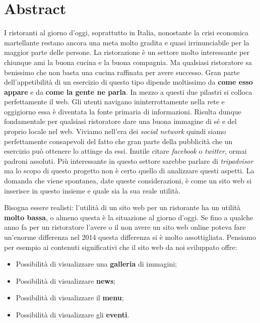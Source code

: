 \section{Abstract}

I ristoranti al giorno d'oggi, soprattutto in Italia, nonostante la crisi economica martellante restano ancora una meta molto gradita e quasi irrinunciabile per la maggior parte delle persone. La ristorazione è un settore molto interessante per chiunque ami la buona cucina e la buona compagnia. Ma qualsiasi ristoratore sa benissimo che non basta una cucina raffinata per avere successo. Gran parte dell'appetibilità di un esercizio di questo tipo dipende moltissimo da \textbf{come esso appare} e da \textbf{come la gente ne parla}. In mezzo a questi due pilastri si colloca perfettamente il web. Gli utenti navigano ininterrottamente nella rete e oggigiorno essa è diventata la fonte primaria di informazioni. Risulta dunque fondamentale per qualsiasi ristoratore dare una buona immagine di sé e del proprio locale nel web. Viviamo nell'era dei \textit{social network} quindi siamo perfettamente consapevoli del fatto che gran parte della pubblicità che un esercizio può ottenere lo attinge da essi. Inutile citare \textit{facebook} o \textit{twitter}, ormai padroni assoluti. Più interessante in questo settore sarebbe parlare di \textit{tripadvisor} ma lo scopo di questo progetto non è certo quello di analizzare questi aspetti. La domanda che viene spontanea, date queste considerazioni, è come un sito web si inserisce in questo insieme e quale sia la sua reale utilità. 

Bisogna essere realisti: l'utilità di un sito web per un ristorante ha un utilità \textbf{molto bassa}, o almeno questa è la situazione al giorno d'oggi. Se fino a qualche anno fa per un ristoratore l'avere o il non avere un sito web online poteva fare un'enorme differenza nel 2014 questa differenza si è molto assottigliata. Pensiamo per esempio ai contenuti significativi che il sito web da noi sviluppato offre:

\begin{itemize}

	\item Possibilità di visualizzare una \textbf{galleria} di immagini;
	\item Possibilità di visualizzare \textbf{news};
	\item Possibilità di visualizzare il \textbf{menu};
	\item Possibilità di visualizzare gli \textbf{eventi}.

\end{itemize}

